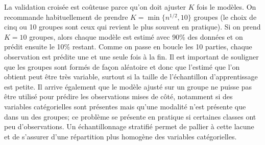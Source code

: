 \documentclass[
  11pt,
  letterpaper,
]{scrbook}
\theoremstyle{definition}
\theoremstyle{remark}
\begin{document}
La validation croisée est coûteuse parce qu'on doit ajuster \(K\) fois
le modèles. On recommande habituellement de prendre
\(K=\min\{n^{1/2}, 10\}\) groupes (le choix de cinq ou 10 groupes sont
ceux qui revient le plus souvent en pratique). Si on prend \(K=10\)
groupes, alors chaque modèle est estimé avec 90\% des données et on
prédit ensuite le 10\% restant. Comme on passe en boucle les 10 parties,
chaque observation est prédite une et une seule fois à la fin. Il est
important de souligner que les groupes sont formés de façon aléatoire et
donc que l'estimé que l'on obtient peut être très variable, surtout si
la taille de l'échantillon d'apprentissage est petite. Il arrive
également que le modèle ajusté sur un groupe ne puisse pas être utilisé
pour prédire les observations mises de côté, notamment si des variables
catégorielles sont présentes mais qu'une modalité n'est présente que
dans un des groupes; ce problème se présente en pratique si certaines
classes ont peu d'observations. Un échantillonnage stratifié permet de
pallier à cette lacune et de s'assurer d'une répartition plus homogène
des variables catégorielles.
\end{document}
